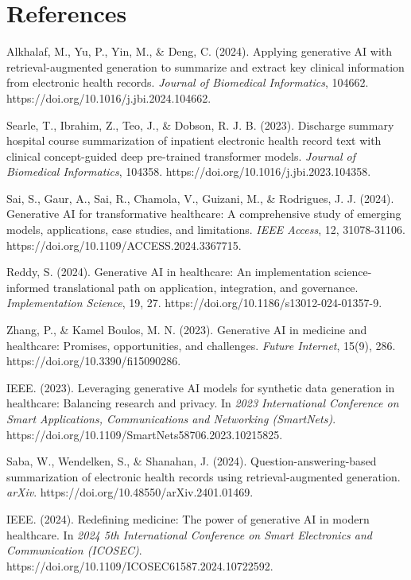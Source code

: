 \section{References}

Alkhalaf, M., Yu, P., Yin, M., & Deng, C. (2024). Applying generative AI with retrieval-augmented generation to summarize and extract key clinical information from electronic health records. \textit{Journal of Biomedical Informatics}, 104662. https://doi.org/10.1016/j.jbi.2024.104662.

Searle, T., Ibrahim, Z., Teo, J., & Dobson, R. J. B. (2023). Discharge summary hospital course summarization of inpatient electronic health record text with clinical concept-guided deep pre-trained transformer models. \textit{Journal of Biomedical Informatics}, 104358. https://doi.org/10.1016/j.jbi.2023.104358.

Sai, S., Gaur, A., Sai, R., Chamola, V., Guizani, M., & Rodrigues, J. J. (2024). Generative AI for transformative healthcare: A comprehensive study of emerging models, applications, case studies, and limitations. \textit{IEEE Access}, 12, 31078-31106. https://doi.org/10.1109/ACCESS.2024.3367715.

Reddy, S. (2024). Generative AI in healthcare: An implementation science-informed translational path on application, integration, and governance. \textit{Implementation Science}, 19, 27. https://doi.org/10.1186/s13012-024-01357-9.

Zhang, P., & Kamel Boulos, M. N. (2023). Generative AI in medicine and healthcare: Promises, opportunities, and challenges. \textit{Future Internet}, 15(9), 286. https://doi.org/10.3390/fi15090286.

IEEE. (2023). Leveraging generative AI models for synthetic data generation in healthcare: Balancing research and privacy. In \textit{2023 International Conference on Smart Applications, Communications and Networking (SmartNets)}. https://doi.org/10.1109/SmartNets58706.2023.10215825.

Saba, W., Wendelken, S., & Shanahan, J. (2024). Question-answering-based summarization of electronic health records using retrieval-augmented generation. \textit{arXiv}. https://doi.org/10.48550/arXiv.2401.01469.

IEEE. (2024). Redefining medicine: The power of generative AI in modern healthcare. In \textit{2024 5th International Conference on Smart Electronics and Communication (ICOSEC)}. https://doi.org/10.1109/ICOSEC61587.2024.10722592.


